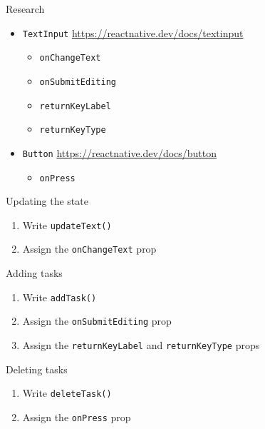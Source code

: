 \documentclass{beamer}
\begin{document}
\begin{frame}{Research}
	\begin{itemize}
		\item \texttt{TextInput} \href{https://reactnative.dev/docs/textinput}{https://reactnative.dev/docs/textinput}
		\begin{itemize}
			\item \texttt{onChangeText}
			\item \texttt{onSubmitEditing}
			\item \texttt{returnKeyLabel}
			\item \texttt{returnKeyType}
		\end{itemize} \pause
		\item \texttt{Button} \href{https://reactnative.dev/docs/button}{https://reactnative.dev/docs/button}
		\begin{itemize}
			\item \texttt{onPress}
		\end{itemize}
	\end{itemize}
\end{frame}

\begin{frame}{Updating the state}
	\begin{enumerate}
		\item Write \texttt{updateText()} \pause
		\item Assign the \texttt{onChangeText} prop
	\end{enumerate}
\end{frame}

\begin{frame}{Adding tasks}
	\begin{enumerate}
		\item Write \texttt{addTask()} \pause
		\item Assign the \texttt{onSubmitEditing} prop \pause
		\item Assign the \texttt{returnKeyLabel} and \texttt{returnKeyType} props
	\end{enumerate}
\end{frame}

\begin{frame}{Deleting tasks}
	\begin{enumerate}
		\item Write \texttt{deleteTask()} \pause
		\item Assign the \texttt{onPress} prop
	\end{enumerate}
\end{frame}
\end{document}
